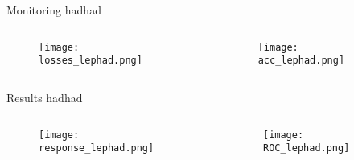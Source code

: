\begin{frame}{Monitoring hadhad}
\begin{columns}
  \begin{column}{0.5\textwidth}
    \begin{figure}
      \texttt{[image: losses\_lephad.png]}
    \end{figure}
  \end{column}
  \begin{column}{0.5\textwidth}
    \begin{figure}
      \texttt{[image: acc\_lephad.png]}
    \end{figure}
  \end{column}
\end{columns}
\end{frame}

\begin{frame}{Results hadhad}
\begin{columns}
  \begin{column}{0.5\textwidth}
    \begin{figure}
      \texttt{[image: response\_lephad.png]}
    \end{figure}
  \end{column}
  \begin{column}{0.5\textwidth}
    \begin{figure}
      \texttt{[image: ROC\_lephad.png]}
    \end{figure}
  \end{column}
\end{columns}
\end{frame}
